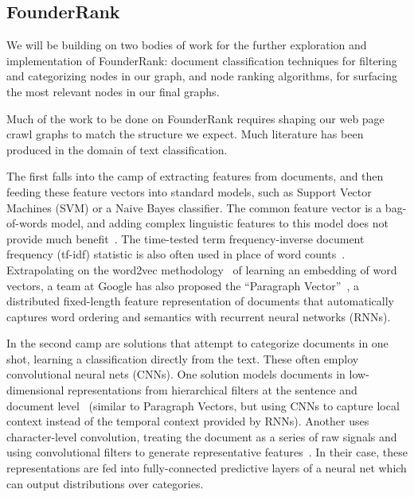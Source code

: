 \subsection*{FounderRank}

We will be building on two bodies of work for the further exploration and implementation of FounderRank: document classification techniques for filtering and categorizing nodes in our graph, and node ranking algorithms, for surfacing the most relevant nodes in our final graphs.

Much of the work to be done on FounderRank requires shaping our web page crawl graphs to match the structure we expect. Much literature has been produced in the domain of text classification.

The first falls into the camp of extracting features from documents, and then feeding these feature vectors into standard models, such as Support Vector Machines (SVM) or a Naive Bayes classifier. The common feature vector is a bag-of-words model, and adding complex linguistic features to this model does not provide much benefit~\cite{Moschitti2004}. The time-tested term frequency-inverse document frequency (tf-idf) statistic is also often used in place of word counts~\cite{Salton:1986:IMI:576628}. Extrapolating on the word2vec methodology~\cite{DBLP:journals/corr/abs-1301-3781} of learning an embedding of word vectors, a team at Google has also proposed the ``Paragraph Vector''~\cite{DBLP:journals/corr/LeM14}, a distributed fixed-length feature representation of documents that automatically captures word ordering and semantics with recurrent neural networks (RNNs).

In the second camp are solutions that attempt to categorize documents in one shot, learning a classification directly from the text. These often employ convolutional neural nets (CNNs). One solution models documents in low-dimensional representations from hierarchical filters at the sentence and document level~\cite{DBLP:journals/corr/DenilDKBF14} (similar to Paragraph Vectors, but using CNNs to capture local context instead of the temporal context provided by RNNs). Another uses character-level convolution, treating the document as a series of raw signals and using convolutional filters to generate representative features~\cite{DBLP:journals/corr/ZhangZL15}. In their case, these representations are fed into fully-connected predictive layers of a neural net which can output distributions over categories.

